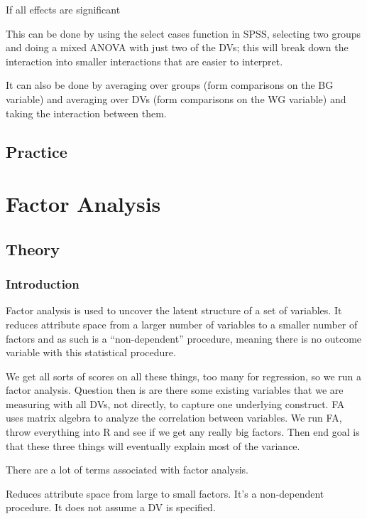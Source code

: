 \documentclass[]{book}
\theoremstyle{definition}
\theoremstyle{definition}
\theoremstyle{definition}
\theoremstyle{remark}
\begin{document}
If all effects are significant

This can be done by using the select cases function in SPSS, selecting
two groups and doing a mixed ANOVA with just two of the DVs; this will
break down the interaction into smaller interactions that are easier to
interpret.

It can also be done by averaging over groups (form comparisons on the BG
variable) and averaging over DVs (form comparisons on the WG variable)
and taking the interaction between them.

\section{Practice}\label{practice-3}

\chapter{Factor Analysis}\label{factor-analysis}

\section{Theory}\label{theory-2}

\subsection{Introduction}\label{introduction}

Factor analysis is used to uncover the latent structure of a set of
variables. It reduces attribute space from a larger number of variables
to a smaller number of factors and as such is a ``non-dependent''
procedure, meaning there is no outcome variable with this statistical
procedure.

We get all sorts of scores on all these things, too many for regression,
so we run a factor analysis. Question then is are there some existing
variables that we are measuring with all DVs, not directly, to capture
one underlying construct. FA uses matrix algebra to analyze the
correlation between variables. We run FA, throw everything into R and
see if we get any really big factors. Then end goal is that these three
things will eventually explain most of the variance.

There are a lot of terms associated with factor analysis.

Reduces attribute space from large to small factors. It's a
non-dependent procedure. It does not assume a DV is specified.
\end{document}

